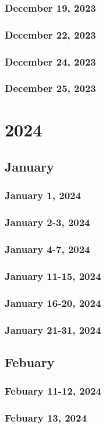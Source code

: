 \section{December 19, 2023}

\section{December 22, 2023}

\section{December 24, 2023}

\section{December 25, 2023}


\part{2024}
\chapter{January}
\section{January 1, 2024}

\section{January 2-3, 2024}

\section{January 4-7, 2024}

\section{January 11-15, 2024}

\section{January 16-20, 2024}

\section{January 21-31, 2024}


\chapter{Febuary}
\section{Febuary 11-12, 2024}

\section{Febuary 13, 2024}

